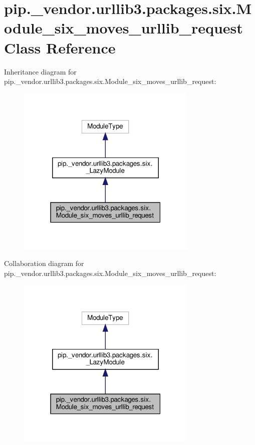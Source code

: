 \hypertarget{classpip_1_1__vendor_1_1urllib3_1_1packages_1_1six_1_1Module__six__moves__urllib__request}{}\section{pip.\+\_\+vendor.\+urllib3.\+packages.\+six.\+Module\+\_\+six\+\_\+moves\+\_\+urllib\+\_\+request Class Reference}
\label{classpip_1_1__vendor_1_1urllib3_1_1packages_1_1six_1_1Module__six__moves__urllib__request}


Inheritance diagram for pip.\+\_\+vendor.\+urllib3.\+packages.\+six.\+Module\+\_\+six\+\_\+moves\+\_\+urllib\+\_\+request\+:
\nopagebreak
\begin{figure}[H]
\begin{center}
\leavevmode
\includegraphics[width=244pt]{classpip_1_1__vendor_1_1urllib3_1_1packages_1_1six_1_1Module__six__moves__urllib__request__inherit__graph}
\end{center}
\end{figure}


Collaboration diagram for pip.\+\_\+vendor.\+urllib3.\+packages.\+six.\+Module\+\_\+six\+\_\+moves\+\_\+urllib\+\_\+request\+:
\nopagebreak
\begin{figure}[H]
\begin{center}
\leavevmode
\includegraphics[width=244pt]{classpip_1_1__vendor_1_1urllib3_1_1packages_1_1six_1_1Module__six__moves__urllib__request__coll__graph}
\end{center}
\end{figure}
